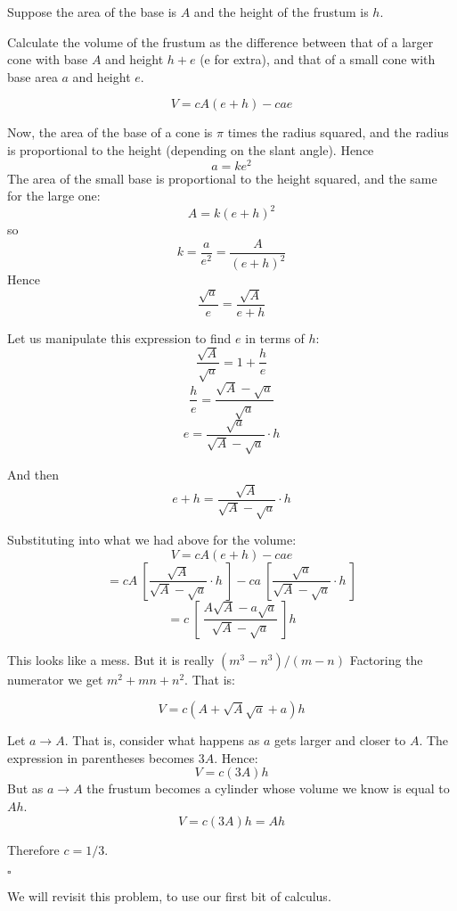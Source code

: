 \documentclass[11pt, oneside]{article}
\begin{document}
Suppose the area of the base is $A$ and the height of the frustum is $h$.  

Calculate the volume of the frustum as the difference between that of a larger cone with base $A$ and height $h + e$ (e for extra), and that of a small cone with base area $a$ and height $e$.

\[ V = cA(e + h) - cae \]

Now, the area of the base of a cone is $\pi$ times the radius squared, and the radius is proportional to the height (depending on the slant angle).  Hence
\[ a = ke^2 \]
The area of the small base is proportional to the height squared, and the same for the large one:
\[ A = k(e + h)^2 \]
so
\[ k = \frac{a}{e^2} =\frac{A}{(e+h)^2} \]
Hence
\[ \frac{\sqrt{a}}{e} = \frac{\sqrt{A}}{e + h} \]

Let us manipulate this expression to find $e$ in terms of $h$:
\[ \frac{\sqrt{A}}{\sqrt{a}} = 1 + \frac{h}{e} \]
\[ \frac{h}{e} = \frac{\sqrt{A} - \sqrt{a}}{\sqrt{a}} \]
\[ e = \frac{\sqrt{a}}{\sqrt{A} - \sqrt{a}} \cdot h \]

And then
\[ e + h = \frac{\sqrt{A}}{\sqrt{A} - \sqrt{a}} \cdot h \]

Substituting into what we had above for the volume:
\[ V = cA(e+h) - cae \]
\[ = cA \ [ \frac{\sqrt{A}}{\sqrt{A} - \sqrt{a}} \cdot h \ ] - ca \ [ \frac{\sqrt{a}}{\sqrt{A} - \sqrt{a}}  \cdot h \ ] \]
\[ = c \ [ \   \frac{A \sqrt{A} - a \sqrt{a}}{\sqrt{A} - \sqrt{a}} \ ] h \]

This looks like a mess.  But it is really $(m^3 - n^3)/(m-n)$  Factoring the numerator we get $m^2 + mn + n^2$.  That is:

\[ V = c (A + \sqrt{A} \sqrt{a} + a) h \]

Let $a \rightarrow A$.  That is, consider what happens as $a$ gets larger and closer to $A$. The expression in parentheses becomes $3A$.  Hence:
\[ V = c(3A)h \]
But as $a \rightarrow A$ the frustum becomes a cylinder whose volume we know is equal to $Ah$. 
\[ V = c(3A)h = Ah \]

Therefore $c = 1/3$.

$\square$

We will revisit this problem, to use our first bit of calculus.  
\end{document}
